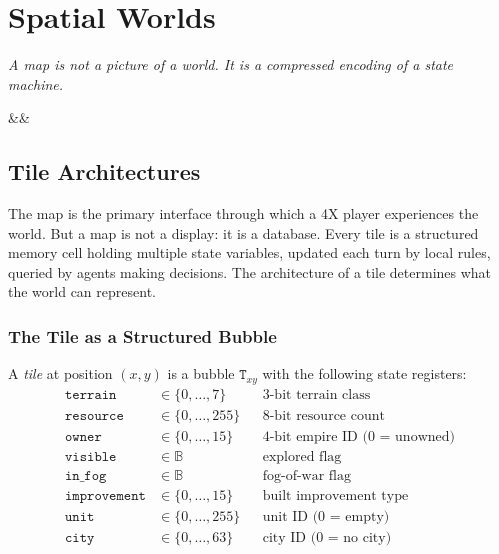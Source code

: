 \documentclass[11pt,a4paper,openany]{book}
\theoremstyle{plain}
\theoremstyle{definition}
\theoremstyle{remark}
\newenvironment{background}{%
  \begin{mdframed}[
    linecolor=sphereblue!40, backgroundcolor=sphereblue!5,
    linewidth=1pt, innertopmargin=8pt, innerbottommargin=8pt,
    innerleftmargin=10pt, innerrightmargin=10pt,
    skipabove=10pt, skipbelow=6pt
  ]%
  \setlength{\parindent}{0pt}%
  \noindent{\textcolor{sphereblue}{\textbf{Background}}}\par\smallskip\ignorespaces
}{\end{mdframed}}
\newenvironment{defbox}[1]{%
  \begin{tcolorbox}[
    title={\textbf{Definition:} #1},
    colback=defbg,
    colframe=sphereamber!80,
    fonttitle=\bfseries,
    coltitle=sphereamber!60!black,
    sharp corners,
    breakable,
    before upper={\normalfont\setlength{\parindent}{0pt}\tolerance=9999\hbadness=9999}
  ]
}{\end{tcolorbox}}
\newcommand{\bool}{\mathbb{B}}
\newcommand{\tile}[1]{\mathtt{T}_{#1}}
\newcommand{\chapterquote}[2]{%
  \par\vspace{0.8em}%
  \begin{flushright}%
    \begin{minipage}{0.65\textwidth}%
      {\itshape #1\par}%
      \ifx&#2&\else\vspace{0.3em}{\raggedleft\small--- #2\par}\fi%
    \end{minipage}%
  \end{flushright}%
  \vspace{0.8em}\par\noindent}
\begin{document}

\part{Spatial Worlds}

\chapterquote{A map is not a picture of a world.
  It is a compressed encoding of a state machine.
}{}

\chapter{Tile Architectures}
\label{ch:tiles}

\begin{background}
  The map is the primary interface through which a 4X player experiences
  the world. But a map is not a display: it is a database. Every tile is
  a structured memory cell holding multiple state variables, updated each
  turn by local rules, queried by agents making decisions. The architecture
  of a tile determines what the world can represent.
\end{background}

\section{The Tile as a Structured Bubble}

\begin{defbox}{Tile}
  A \emph{tile} at position $(x, y)$ is a bubble $\tile{xy}$ with the
  following state registers:
  \begin{align*}
    \texttt{terrain} &\in \{0,\ldots,7\} &&\text{3-bit terrain class} \\
    \texttt{resource} &\in \{0,\ldots,255\} &&\text{8-bit resource count} \\
    \texttt{owner} &\in \{0,\ldots,15\} &&\text{4-bit empire ID (0 = unowned)} \\
    \texttt{visible} &\in \bool &&\text{explored flag} \\
    \texttt{in\_fog} &\in \bool &&\text{fog-of-war flag} \\
    \texttt{improvement} &\in \{0,\ldots,15\} &&\text{built improvement type} \\
    \texttt{unit} &\in \{0,\ldots,255\} &&\text{unit ID (0 = empty)} \\
    \texttt{city} &\in \{0,\ldots,63\} &&\text{city ID (0 = no city)} \\
  \end{align*}
\end{defbox}
\end{document}
